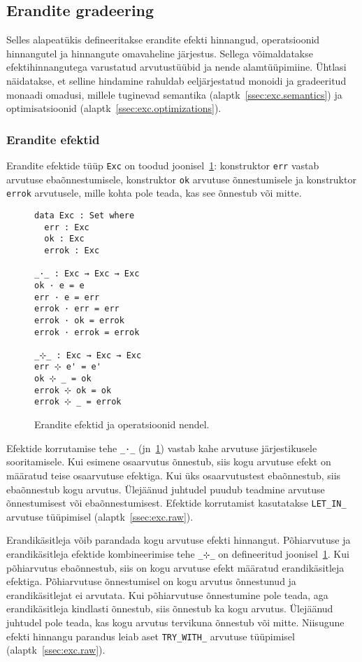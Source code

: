 \documentclass[a4paper,12pt]{article}
\begin{document}
\subsection{Erandite gradeering}\label{ssec:exc.grading}

Selles alapeatükis defineeritakse erandite efekti hinnangud, operatsioonid hinnangutel ja hinnangute omavaheline järjestus.
Sellega võimaldatakse efektihinnangutega varustatud arvutustüübid ja nende alamtüüpimiine.
Ühtlasi näidatakse, et selline hindamine rahuldab eeljärjestatud monoidi ja gradeeritud monaadi omadusi,
millele tuginevad semantika (alaptk~\ref{ssec:exc.semantics}) ja optimisatsioonid (alaptk~\ref{ssec:exc.optimizations}). 

\subsubsection{Erandite efektid}\label{sssec:exc.exc}

Erandite efektide tüüp {\tt Exc} on toodud joonisel~\ref{fig:exc.exc}:
konstruktor {\tt err} vastab arvutuse ebaõnnestumisele,
konstruktor {\tt ok} arvutuse õnnestumisele ja konstruktor {\tt errok} arvutusele,
mille kohta pole teada, kas see õnnestub või mitte.

\begin{figure}
  \begin{BVerbatim}
data Exc : Set where
  err : Exc
  ok : Exc
  errok : Exc

_·_ : Exc → Exc → Exc
ok · e = e
err · e = err
errok · err = err
errok · ok = errok
errok · errok = errok

_⊹_ : Exc → Exc → Exc
err ⊹ e' = e'
ok ⊹ _ = ok
errok ⊹ ok = ok
errok ⊹ _ = errok
  \end{BVerbatim}
  \caption{Erandite efektid ja operatsioonid nendel.}
  \label{fig:exc.exc}
\end{figure}

Efektide korrutamise tehe {\tt _·_} (jn~\ref{fig:exc.exc}) vastab kahe arvutuse järjestikusele sooritamisele.
Kui esimene osaarvutus õnnestub, siis kogu arvutuse efekt on määratud teise osaarvutuse efektiga.
Kui üks osaarvutustest ebaõnnestub, siis ebaõnnestub kogu arvutus.
Ülejäänud juhtudel puudub teadmine arvutuse õnnestumisest või ebaõnnestumisest.
Efektide korrutamist kasutatakse {\tt LET_IN_} arvutuse tüüpimisel (alaptk~\ref{ssec:exc.raw}).

Erandikäsitleja võib parandada kogu arvutuse efekti hinnangut.
Põhiarvutuse ja erandikäsitleja efektide kombineerimise tehe {\tt _⊹_} on defineeritud joonisel~\ref{fig:exc.exc}.
Kui põhiarvutus ebaõnnestub, siis on kogu arvutuse efekt määratud erandikäsitleja efektiga.
Põhiarvutuse õnnestumisel on kogu arvutus õnnestunud ja erandikäsitlejat ei arvutata.
Kui põhiarvutuse õnnestumine pole teada, aga erandikäsitleja kindlasti õnnestub, siis õnnestub ka kogu arvutus.
Ülejäänud juhtudel pole teada, kas kogu arvutus tervikuna õnnestub või mitte.
Niisugune efekti hinnangu parandus leiab aset {\tt TRY_WITH_} arvutuse tüüpimisel (alaptk~\ref{ssec:exc.raw}).
\end{document}
